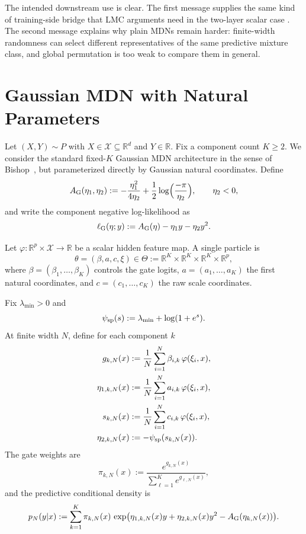 \documentclass[11pt]{article}
\theoremstyle{definition}
\newcommand{\R}{\mathbb{R}}
\newcommand{\mc}[1]{\mathcal{#1}}
\begin{document}
The intended downstream use is clear. The first message supplies the same kind
of training-side bridge that LMC arguments need in the two-layer scalar case
\cite{FerbachEtAl2024}. The second message explains why plain MDNs remain
harder: finite-width randomness can select different representatives of the same
predictive mixture class, and global permutation is too weak to compare them in
general.

\section{Gaussian MDN with Natural Parameters}

Let $(X,Y)\sim P$ with $X\in\mc{X}\subseteq \R^d$ and $Y\in\R$. Fix a component
count $K\ge 2$. We consider the standard fixed-$K$ Gaussian MDN architecture in
the sense of Bishop~\cite{Bishop2006}, but parameterized directly by Gaussian
natural coordinates. Define
\[
  A_{\rm G}(\eta_1,\eta_2)
  :=
  -\frac{\eta_1^2}{4\eta_2}
  + \frac12 \log\!\Big(\frac{-\pi}{\eta_2}\Big),
  \qquad \eta_2<0,
\]
and write the component negative log-likelihood as
\[
  \ell_{\rm G}(\eta;y)
  :=
  A_{\rm G}(\eta)-\eta_1 y-\eta_2 y^2.
\]

Let $\varphi:\R^p\times \mc{X}\to \R$ be a scalar hidden feature map. A single particle
is
\[
  \theta=(\beta,a,c,\xi)\in \Theta:=\R^K\times\R^K\times\R^K\times \R^p,
\]
where $\beta=(\beta_1,\dots,\beta_K)$ controls the gate logits,
$a=(a_1,\dots,a_K)$ the first natural coordinates, and
$c=(c_1,\dots,c_K)$ the raw scale coordinates.

Fix $\lambda_{\min}>0$ and
\[
  \psi_{\rm sp}(s):=\lambda_{\min}+\log(1+e^s).
\]
At finite width $N$, define for each component $k$
\begin{align}
  g_{k,N}(x)
  &:=
  \frac1N\sum_{i=1}^N \beta_{i,k}\,\varphi(\xi_i,x),
  \\
  \eta_{1,k,N}(x)
  &:=
  \frac1N\sum_{i=1}^N a_{i,k}\,\varphi(\xi_i,x),
  \\
  s_{k,N}(x)
  &:=
  \frac1N\sum_{i=1}^N c_{i,k}\,\varphi(\xi_i,x),
  \\
  \eta_{2,k,N}(x)
  &:=
  -\psi_{\rm sp}(s_{k,N}(x)).
\end{align}
The gate weights are
\[
  \pi_{k,N}(x)
  :=
  \frac{e^{g_{k,N}(x)}}{\sum_{\ell=1}^K e^{g_{\ell,N}(x)}},
\]
and the predictive conditional density is
\begin{equation}
  p_N(y|x)
  :=
  \sum_{k=1}^K
  \pi_{k,N}(x)\,
  \exp\!\big(
    \eta_{1,k,N}(x)y + \eta_{2,k,N}(x)y^2 - A_{\rm G}(\eta_{k,N}(x))
  \big).
  \label{eq:finite-mdn-density}
\end{equation}
\end{document}
